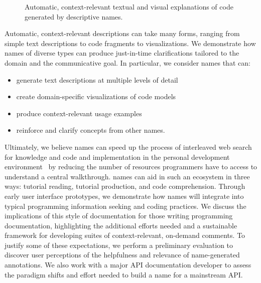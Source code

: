 \begin{figure}[!t]
\label{fig:tutorons}
\caption{Automatic, context-relevant textual and visual explanations of code generated by descriptive \glspl{name}.}
\end{figure}

Automatic, context-relevant descriptions can take many forms, ranging from simple text descriptions to code fragments to visualizations. 
We demonstrate how \glspl{name} of diverse types can produce just-in-time clarifications tailored to the domain and the communicative goal.
In particular, we consider \glspl{name} that can:
\begin{itemize} \itemsep1pt
\item generate text descriptions at multiple levels of detail
\item create domain-specific visualizations of code models
\item produce context-relevant usage examples
\item reinforce and clarify concepts from other \glspl{name}.
\end{itemize}

Ultimately, we believe \glspl{name} can speed up the process of interleaved web search for knowledge and code and implementation in the personal development environment~\cite{brandt} by reducing the number of resources programmers have to access to understand a central walkthrough.
\Glspl{name} can aid in such an ecosystem in three ways: tutorial reading, tutorial production, and code comprehension.
Through early user interface prototypes, we demonstrate how \glspl{name} will integrate into typical programming information seeking and coding practices.
We discuss the implications of this style of documentation for those writing programming documentation, highlighting the additional efforts needed and a sustainable framework for developing suites of context-relevant, on-demand comments.
To justify some of these expectations, we perform a preliminary evaluation to discover user perceptions of the helpfulness and relevance of \gls{name}-generated annotations.
We also work with a major API documentation developer to assess the paradigm shifts and effort needed to build a \gls{name} for a mainstream API.

